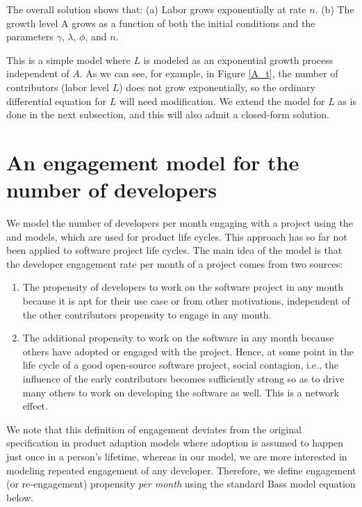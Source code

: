 \documentclass[conference]{IEEEtran}
\begin{document}
The overall solution shows that: (a) Labor grows exponentially at rate $n$. (b) The growth level A grows as a function of both the initial conditions and the parameters $\gamma$, $\lambda$, $\phi$, and $n$.

This is a simple model where $L$ is modeled as an exponential growth process independent of $A$. As we can see, for example, in Figure \ref{A_t}, the number of contributors (labor level $L$) does not grow exponentially, so the ordinary differential equation for $L$ will need modification. We extend the model for $L$ as is done in the next subsection, and this will also admit a closed-form solution.  

\section{An engagement model for the number of developers}
\label{sec:dev_engagement}

We model the number of developers per month engaging with a project  using the \cite{bass_new_1969} and \cite{bass_why_1994} models, which are used for product life cycles. This approach has so far not been applied to software project life cycles. The main idea of the model is that the developer engagement rate per month of a project comes from two sources: 
\begin{enumerate}
\item The propensity of developers to work on the software project in any month because it is apt for their use case or from other motivations, independent of the other contributors propensity to engage in any month.
\item The additional propensity to work on the software in any month because others have adopted or engaged with the project. Hence, at some point in the life cycle of a good open-source software project, social contagion, i.e., the influence of the early contributors becomes sufficiently strong so as to drive many others to work on developing the software as well. This is a network effect.
\end{enumerate}

We note that this definition of engagement deviates from the original specification in product adaption models where adoption is assumed to happen just once in a person's lifetime, whereas in our model, we are more interested in modeling repeated engagement of any developer. Therefore, we define engagement (or re-engagement) propensity {\em per month} using the standard Bass model equation below.
\end{document}

